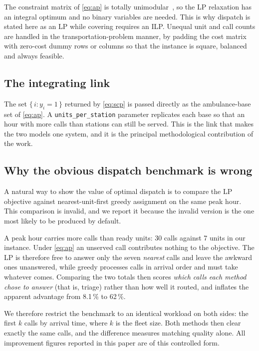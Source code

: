 \documentclass[conference]{IEEEtran}
\begin{document}
The constraint matrix of \eqref{eq:ap} is totally unimodular~\cite{hoffman1956},
so the LP relaxation has an integral optimum and no binary variables are needed.
This is why dispatch is stated here as an LP while covering requires an
ILP. Unequal unit and call counts are handled in the transportation-problem
manner, by padding the cost matrix with zero-cost dummy rows or columns so that
the instance is square, balanced and always feasible.

\subsection{The integrating link}

The set $\{\, i : y_i = 1 \,\}$ returned by \eqref{eq:scp} is passed directly as
the ambulance-base set of \eqref{eq:ap}. A \texttt{units\_per\_station}
parameter replicates each base so that an hour with more calls than stations can
still be served. This is the link that makes the two models one system, and it
is the principal methodological contribution of the work.

\subsection{Why the obvious dispatch benchmark is wrong}
\label{sec:honest}

A natural way to show the value of optimal dispatch is to compare the LP
objective against nearest-unit-first greedy assignment on the same peak hour.
This comparison is invalid, and we report it because the invalid version is the
one most likely to be produced by default.

A peak hour carries more calls than ready units: 30 calls against 7 units in
our instance. Under \eqref{eq:ap} an unserved call contributes nothing to the
objective. The LP is therefore free to answer only the seven \emph{nearest}
calls and leave the awkward ones unanswered, while greedy processes calls in
arrival order and must take whatever comes. Comparing the two totals then scores
\emph{which calls each method chose to answer} (that is, triage) rather
than how well it routed, and inflates the apparent advantage from 8.1\,\% to
62\,\%.

We therefore restrict the benchmark to an identical workload on both sides: the
first $k$ calls by arrival time, where $k$ is the fleet size. Both methods then
clear exactly the same calls, and the difference measures matching quality
alone. All improvement figures reported in this paper are of this controlled
form.
\end{document}
